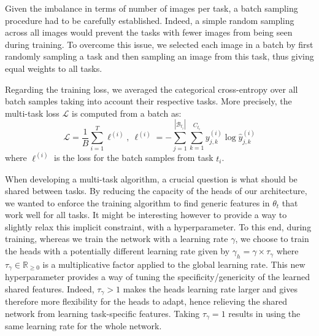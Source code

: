 Given the imbalance in terms of number of images per task, a batch sampling procedure had to be carefully established. Indeed, a simple random sampling across all images would prevent the tasks with fewer images from being seen during training. To overcome this issue, we selected each image in a batch by first randomly sampling a task and then sampling an image from this task, thus giving equal weights to all tasks.

Regarding the training loss, we averaged the categorical cross-entropy over all batch samples taking into account their respective tasks. More precisely, the multi-task loss $\mathcal{L}$ is computed from a batch as:
\begin{equation}\label{eqn:loss}
\mathcal{L} = \frac{1}{B} \sum_{i=1}^T \ell^{(i)},\ \ell^{(i)} = - \sum_{j=1}^{\left|\mathcal{B}_{t_i}\right|} \sum_{k=1}^{C_{t_i}} y^{(i)}_{j,k} \log \hat{y}^{(i)}_{j,k}
\end{equation}
where $\ell^{(i)}$ is the loss for the batch samples from task $t_i$.

When developing a multi-task algorithm, a crucial question is what should be shared between tasks. By reducing the capacity of the heads of our architecture, we wanted to enforce the training algorithm to find generic features in $\theta_t$ that work well for all tasks. It might be interesting however to provide a way to slightly relax this implicit constraint, with a hyperparameter. To this end, during training, whereas we train the network with a learning rate $\gamma$, we choose to train the heads with a potentially different learning rate given by $\gamma_h = \gamma \times \tau_\gamma$ where $\tau_\gamma \in \mathbb{R}_{\geq0}$ is a multiplicative factor applied to the global learning rate. This new hyperparameter provides a way of tuning the specificity/genericity of the learned shared features.  Indeed, $\tau_\gamma > 1$ makes the heads learning rate larger and gives therefore more flexibility for the heads to adapt, hence relieving the shared network from learning task-specific features. Taking $\tau_\gamma = 1$ results in using the same learning rate for the whole network.

